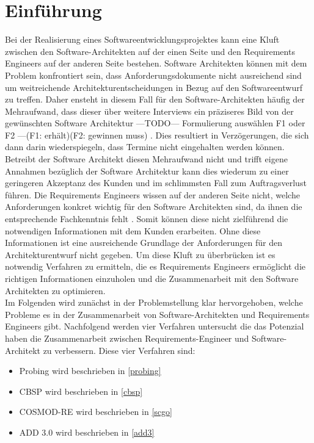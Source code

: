 \section{Einf\"uhrung}
Bei der Realisierung eines Softwareentwicklungsprojektes kann eine Kluft zwischen den Software-Architekten auf der einen Seite und den Requirements Engineers auf der anderen Seite bestehen. Software Architekten k\"onnen mit dem Problem konfrontiert sein, dass Anforderungsdokumente nicht ausreichend sind um weitreichende Architekturentscheidungen in Bezug auf den Softwareentwurf zu treffen. Daher ensteht in diesem Fall f\"ur den Software-Architekten h\"aufig der Mehraufwand, dass dieser \"uber weitere Interviews ein pr\"aziseres Bild von der gew\"unschten Software Architektur ---TODO--- Formulierung auswählen F1 oder F2 ---(F1: erh\"alt)(F2: gewinnen muss) \cite{Ros01}. Dies resultiert in Verz\"ogerungen, die sich dann darin wiederspiegeln, dass Termine nicht eingehalten werden k\"onnen. Betreibt der Software Architekt diesen Mehraufwand nicht und trifft eigene Annahmen bez\"uglich der Software Architektur \cite{Ros01} kann dies wiederum zu einer geringeren Akzeptanz des Kunden und im schlimmsten Fall zum Auftragsverlust f\"uhren. Die Requirements Engineers wissen auf der anderen Seite nicht, welche Anforderungen konkret wichtig f\"ur den Software Architekten sind, da ihnen die entsprechende Fachkenntnis fehlt \cite{Ros01}. Somit k\"onnen diese nicht zielf\"uhrend die notwendigen Informationen mit dem Kunden erarbeiten. Ohne diese Informationen ist eine ausreichende Grundlage der Anforderungen f\"ur den Architekturentwurf nicht gegeben. Um diese Kluft zu \"uberbr\"ucken ist es notwendig Verfahren zu ermitteln, die es Requirements Engineers erm\"oglicht die richtigen Informationen einzuholen und die Zusammenarbeit mit den Software Architekten zu optimieren.\\

Im Folgenden wird zun\"achst in der Problemstellung klar hervorgehoben, welche Probleme es in der Zusammenarbeit von Software-Architekten und Requirements Engineers gibt. Nachfolgend werden vier Verfahren untersucht die das Potenzial haben die Zusammenarbeit zwischen Requirements-Engineer und Software-Architekt zu verbessern. Diese vier Verfahren sind:\\

\begin{itemize}
\item Probing wird beschrieben in \ref{probing}
\item CBSP wird beschrieben in \ref{cbsp}
\item COSMOD-RE wird beschrieben in \ref{scgo}
\item ADD 3.0 wird beschrieben in \ref{add3}\\
\end{itemize}

